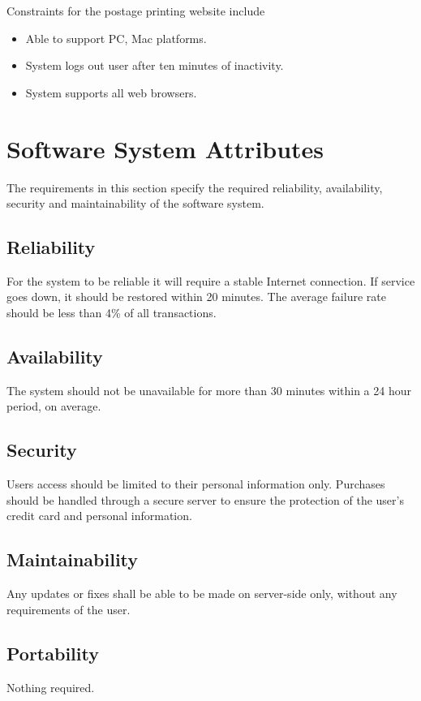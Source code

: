 \documentclass{scrreprt}
\begin{document}
Constraints for the postage printing website include

\begin{itemize}
\item Able to support PC, Mac platforms.
\item System logs out user after ten minutes of inactivity.
\item System supports all web browsers.
\end{itemize}

\section{Software System Attributes}

The requirements in this section specify the required reliability,
availability, security and maintainability of the software system.

\subsection{Reliability}

For the system to be reliable it will require a stable Internet connection. If
service goes down, it should be restored within 20 minutes. The average failure
rate should be less than 4\% of all transactions.

\subsection{Availability}

The system should not be unavailable for more than 30 minutes within a 24 hour
period, on average.

\subsection{Security}

Users access should be limited to their personal information only. Purchases
should be handled through a secure server to ensure the protection of the
user’s credit card and personal information.

\subsection{Maintainability}

Any updates or ﬁxes shall be able to be made on server-side only, without any
requirements of the user.

\subsection{Portability}

Nothing required.

\end{document}
